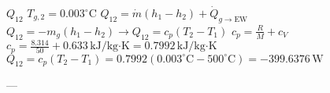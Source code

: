 \( Q_{12} \)  
\( T_{g,2} = 0.003^\circ \text{C} \)  
\( Q_{12} = \dot{m} (h_1 - h_2) + \dot{Q}_{g \to \text{EW}} \)  
\( Q_{12} = -m_g (h_1 - h_2) \to Q_{12} = c_p (T_2 - T_1) \)  
\( c_p = \frac{R}{M} + c_V \)  
\( c_p = \frac{8.314}{50} + 0.633 \, \text{kJ/kg·K} = 0.7992 \, \text{kJ/kg·K} \)  
\( Q_{12} = c_p (T_2 - T_1) = 0.7992 (0.003^\circ \text{C} - 500^\circ \text{C}) = -399.6376 \, \text{W} \)  

---